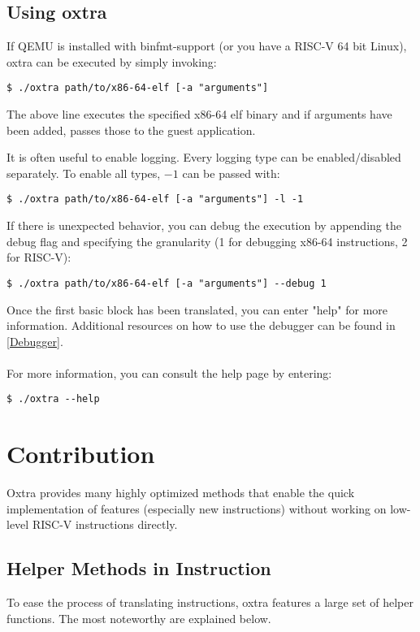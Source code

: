 \subsection{Using oxtra}
If QEMU is installed with binfmt-support (or you have a RISC-V 64 bit Linux), oxtra can be executed by simply invoking:
\begin{lstlisting}
$ ./oxtra path/to/x86-64-elf [-a "arguments"]
\end{lstlisting}

The above line executes the specified x86-64 elf binary and if arguments have been added, passes those to the guest application.

It is often useful to enable logging. Every logging type can be enabled/disabled separately. To enable all types, \(-1\) can be passed with:
\begin{lstlisting}
$ ./oxtra path/to/x86-64-elf [-a "arguments"] -l -1
\end{lstlisting}

If there is unexpected behavior, you can debug the execution by appending the debug flag and specifying the granularity (1 for debugging x86-64 instructions, 2 for RISC-V):
\begin{lstlisting}
$ ./oxtra path/to/x86-64-elf [-a "arguments"] --debug 1
\end{lstlisting}

Once the first basic block has been translated, you can enter "help" for more information. Additional resources on how to use the debugger can be found in \cref{Debugger}.
\\\\
\noindent For more information, you can consult the help page by entering:
\begin{lstlisting}
$ ./oxtra --help
\end{lstlisting}

\pagebreak
\section{Contribution}
Oxtra provides many highly optimized methods that enable the quick implementation of features (especially new instructions) without working on low-level RISC-V instructions directly. 
	
	\subsection{Helper Methods in Instruction}
	To ease the process of translating instructions, oxtra features a large set of helper functions. The most noteworthy are explained below.
	
